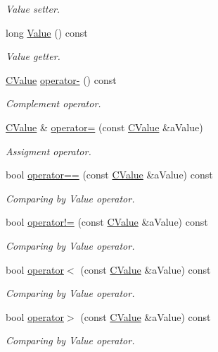 \begin{DoxyCompactItemize}
\begin{DoxyCompactList}\small\item\em Value setter. \end{DoxyCompactList}\item 
long \hyperlink{class_c_value__long_1_1_c_value_acd5b8c8a9c9c6c3d152a2fef95a8ecb1}{Value} () const
\begin{DoxyCompactList}\small\item\em Value getter. \end{DoxyCompactList}\item 
\hyperlink{class_c_value__long_1_1_c_value}{C\+Value} \hyperlink{class_c_value__long_1_1_c_value_a1c73bc6a5bc3fdd11ceb1062932ce771}{operator-\/} () const
\begin{DoxyCompactList}\small\item\em Complement operator. \end{DoxyCompactList}\item 
\hyperlink{class_c_value__long_1_1_c_value}{C\+Value} \& \hyperlink{class_c_value__long_1_1_c_value_a3d7b5e000597012f1eda152df595b450}{operator=} (const \hyperlink{class_c_value__long_1_1_c_value}{C\+Value} \&a\+Value)
\begin{DoxyCompactList}\small\item\em Assigment operator. \end{DoxyCompactList}\item 
bool \hyperlink{class_c_value__long_1_1_c_value_ae1cf790d0fc1318cc6ee5b8d54e43783}{operator==} (const \hyperlink{class_c_value__long_1_1_c_value}{C\+Value} \&a\+Value) const
\begin{DoxyCompactList}\small\item\em Comparing by Value operator. \end{DoxyCompactList}\item 
bool \hyperlink{class_c_value__long_1_1_c_value_a77320781a92d09e2171823eea911eb93}{operator!=} (const \hyperlink{class_c_value__long_1_1_c_value}{C\+Value} \&a\+Value) const
\begin{DoxyCompactList}\small\item\em Comparing by Value operator. \end{DoxyCompactList}\item 
bool \hyperlink{class_c_value__long_1_1_c_value_aac5c450ee9d9e61fb6f0a9d87ae21a65}{operator$<$} (const \hyperlink{class_c_value__long_1_1_c_value}{C\+Value} \&a\+Value) const
\begin{DoxyCompactList}\small\item\em Comparing by Value operator. \end{DoxyCompactList}\item 
bool \hyperlink{class_c_value__long_1_1_c_value_a8cbd37b49a1a9eaf0da3902f70045049}{operator$>$} (const \hyperlink{class_c_value__long_1_1_c_value}{C\+Value} \&a\+Value) const
\begin{DoxyCompactList}\small\item\em Comparing by Value operator. \end{DoxyCompactList}\end{DoxyCompactItemize}
